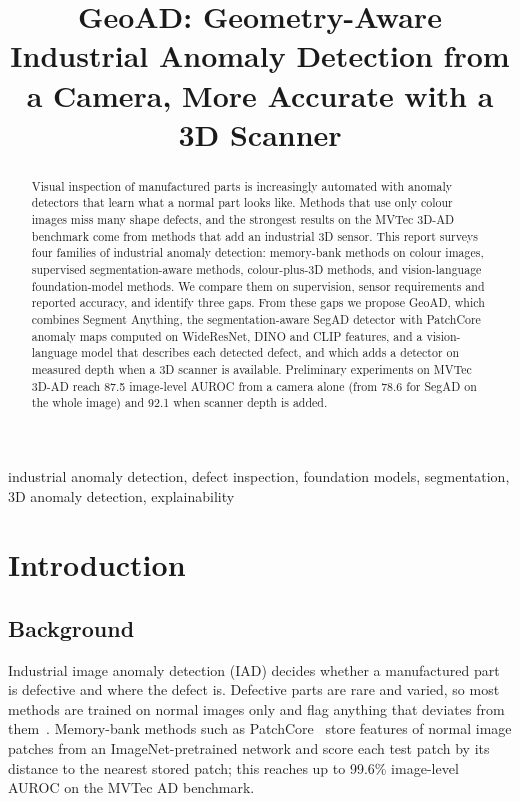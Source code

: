 \documentclass[conference]{IEEEtran}
\begin{document}
\title{GeoAD: Geometry-Aware Industrial Anomaly Detection from a Camera, More Accurate with a 3D Scanner}

\author{
}

\maketitle

\begin{abstract}
Visual inspection of manufactured parts is increasingly automated with anomaly detectors that learn what a normal part looks like. Methods that use only colour images miss many shape defects, and the strongest results on the MVTec 3D-AD benchmark come from methods that add an industrial 3D sensor. This report surveys four families of industrial anomaly detection: memory-bank methods on colour images, supervised segmentation-aware methods, colour-plus-3D methods, and vision-language foundation-model methods. We compare them on supervision, sensor requirements and reported accuracy, and identify three gaps. From these gaps we propose GeoAD, which combines Segment Anything, the segmentation-aware SegAD detector with PatchCore anomaly maps computed on WideResNet, DINO and CLIP features, and a vision-language model that describes each detected defect, and which adds a detector on measured depth when a 3D scanner is available. Preliminary experiments on MVTec 3D-AD reach 87.5 image-level AUROC from a camera alone (from 78.6 for SegAD on the whole image) and 92.1 when scanner depth is added.
\end{abstract}

\begin{IEEEkeywords}
industrial anomaly detection, defect inspection, foundation models, segmentation, 3D anomaly detection, explainability
\end{IEEEkeywords}

\section{Introduction}
\subsection{Background}
Industrial image anomaly detection (IAD) decides whether a manufactured part is defective and where the defect is. Defective parts are rare and varied, so most methods are trained on normal images only and flag anything that deviates from them~\cite{survey}. Memory-bank methods such as PatchCore~\cite{patchcore} store features of normal image patches from an ImageNet-pretrained network and score each test patch by its distance to the nearest stored patch; this reaches up to 99.6\% image-level AUROC on the MVTec AD benchmark.
\end{document}

